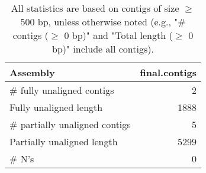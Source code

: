 \documentclass[12pt,a4paper]{article}
\begin{document}
\begin{table}[ht]
\begin{center}
\caption{All statistics are based on contigs of size $\geq$ 500 bp, unless otherwise noted (e.g., "\# contigs ($\geq$ 0 bp)" and "Total length ($\geq$ 0 bp)" include all contigs).}
\begin{tabular}{|l*{1}{|r}|}
\hline
Assembly & final.contigs \\ \hline
\# fully unaligned contigs & 2 \\ \hline
Fully unaligned length & 1888 \\ \hline
\# partially unaligned contigs & 5 \\ \hline
Partially unaligned length & 5299 \\ \hline
\# N's & 0 \\ \hline
\end{tabular}
\end{center}
\end{table}
\end{document}
